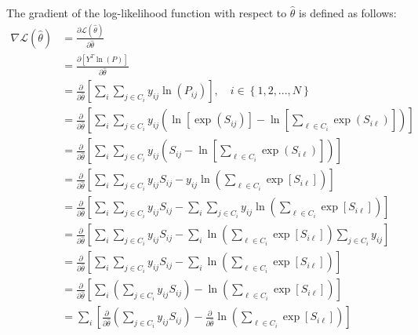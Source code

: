 \documentclass{article}
\begin{document}
The gradient of the log-likelihood function with respect to $\hat{\theta}$ is defined as follows:
\begin{equation*}
\begin{aligned}
\nabla \mathcal{L} \left( \hat{\theta} \right) &= \frac{\partial \mathcal{L} \left( \hat{\theta} \right)}{\partial \hat{\theta}} \\
&= \frac{\partial \left[ Y^T \ln \left( P \right) \right] }{\partial \hat{\theta}} \\
&= \frac{\partial}{\partial \hat{\theta}} \left[ \sum _i \sum _{j \in C_i} y_{ij} \ln \left( P_{ij} \right) \right], \quad i \in \left\lbrace 1, 2, ..., N \right\rbrace \\
&= \frac{\partial}{\partial \hat{\theta}} \left[ \sum _i \sum _{j \in C_i} y_{ij} \left( \ln \left[ \exp \left( S_{ij} \right) \right] - \ln \left[ \sum _{\ell \in C_i} \exp \left( S_{i \ell} \right) \right] \right) \right] \\
&= \frac{\partial}{\partial \hat{\theta}} \left[ \sum _i \sum _{j \in C_i} y_{ij} \left(  S_{ij} - \ln \left[ \sum _{\ell \in C_i} \exp \left( S_{i \ell} \right) \right] \right) \right] \\
&= \frac{\partial}{\partial \hat{\theta}} \left[ \sum _i \sum _{j \in C_i} y_{ij} S_{ij} - y_{ij} \ln \left( \sum _{\ell \in C_i} \exp \left[ S_{i \ell} \right] \right) \right] \\
&= \frac{\partial}{\partial \hat{\theta}} \left[ \sum _i \sum _{j \in C_i} y_{ij} S_{ij} -  \sum _i \sum _{j \in C_i} y_{ij} \ln \left( \sum _{\ell \in C_i} \exp \left[ S_{i \ell} \right] \right) \right] \\
&= \frac{\partial}{\partial \hat{\theta}} \left[ \sum _i \sum _{j \in C_i} y_{ij} S_{ij} -  \sum _i \ln \left( \sum _{\ell \in C_i} \exp \left[ S_{i \ell} \right] \right) \sum _{j \in C_i} y_{ij} \right] \\
&= \frac{\partial}{\partial \hat{\theta}} \left[ \sum _i \sum _{j \in C_i} y_{ij} S_{ij} -  \sum _i \ln \left( \sum _{\ell \in C_i} \exp \left[ S_{i \ell} \right] \right) \right] \\
&= \frac{\partial}{\partial \hat{\theta}} \left[ \sum _i  \left( \sum _{j \in C_i} y_{ij} S_{ij} \right) -  \ln \left( \sum _{\ell \in C_i} \exp \left[ S_{i \ell} \right] \right) \right] \\
&= \sum _i  \left[  \frac{\partial}{\partial \hat{\theta}} \left( \sum _{j \in C_i} y_{ij} S_{ij} \right) - \frac{\partial}{\partial \hat{\theta}} \ln \left( \sum _{\ell \in C_i} \exp \left[ S_{i \ell} \right] \right) \right] \\

\end{aligned}
\end{equation*}
\end{document}
